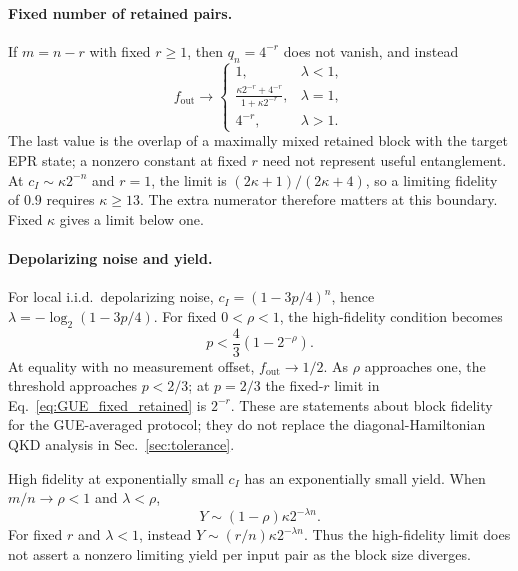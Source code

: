 \documentclass[onecolumn,prx,longbibliography,nofootinbib, superscriptaddress]{revtex4-2}
\theoremstyle{recap}
\begin{document}
\paragraph{Fixed number of retained pairs.}
If $m=n-r$ with fixed $r\geq1$, then $q_n=4^{-r}$ does not vanish, and instead
\begin{equation}\label{eq:GUE_fixed_retained}
    f_{\mathrm{out}}\longrightarrow
    \begin{cases}
        1,&\lambda<1,\\
        \displaystyle\frac{\kappa2^{-r}+4^{-r}}{1+\kappa2^{-r}},&\lambda=1,\\
        4^{-r},&\lambda>1.
    \end{cases}
\end{equation}
The last value is the overlap of a maximally mixed retained block with the target EPR state; a nonzero constant at fixed $r$ need not represent useful entanglement. At $c_I\sim\kappa2^{-n}$ and $r=1$, the limit is $(2\kappa+1)/(2\kappa+4)$, so a limiting fidelity of $0.9$ requires $\kappa\geq13$. The extra numerator therefore matters at this boundary. Fixed $\kappa$ gives a limit below one.

\paragraph{Depolarizing noise and yield.}
For local i.i.d.\ depolarizing noise, $c_I=(1-3p/4)^n$, hence $\lambda=-\log_2(1-3p/4)$. For fixed $0<\rho<1$, the high-fidelity condition becomes
\begin{equation}\label{eq:GUE_depolarizing_threshold}
    p<\frac43\left(1-2^{-\rho}\right).
\end{equation}
At equality with no measurement offset, $f_{\mathrm{out}}\to1/2$. As $\rho$ approaches one, the threshold approaches $p<2/3$; at $p=2/3$ the fixed-$r$ limit in Eq.~\eqref{eq:GUE_fixed_retained} is $2^{-r}$. These are statements about block fidelity for the GUE-averaged protocol; they do not replace the diagonal-Hamiltonian QKD analysis in Sec.~\ref{sec:tolerance}.

High fidelity at exponentially small $c_I$ has an exponentially small yield. When $m/n\to\rho<1$ and $\lambda<\rho$,
\begin{equation}
    Y\sim(1-\rho)\kappa2^{-\lambda n}.
\end{equation}
For fixed $r$ and $\lambda<1$, instead $Y\sim(r/n)\kappa2^{-\lambda n}$. Thus the high-fidelity limit does not assert a nonzero limiting yield per input pair as the block size diverges.
\end{document}
